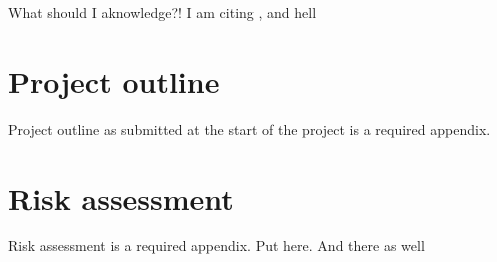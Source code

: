 
\makeatletter
\title{\xmp@Title}
\studentid{\xmp@Author}
\makeatother

\maketitle



\uomtoc


\begin{abstract} %
  This is abstract text.

  \lipsum[1-2]
\end{abstract}%
\clearpage


\uomdeclarations %


\begin{uomacknowledgements}
What should I aknowledge?! I am citing \cite{this}, and \cite{that} hell
\end{uomacknowledgements}





\printbibliography[title={References},heading=bibintoc]


\newpage
\printglossary[type=\acronymtype]

\begin{uomappendix}
    \section{Project outline}
    Project outline as submitted at the start of the project is a required appendix.

    \section{Risk assessment}
    Risk assessment is a required appendix. Put here. And there as well
\end{uomappendix}


